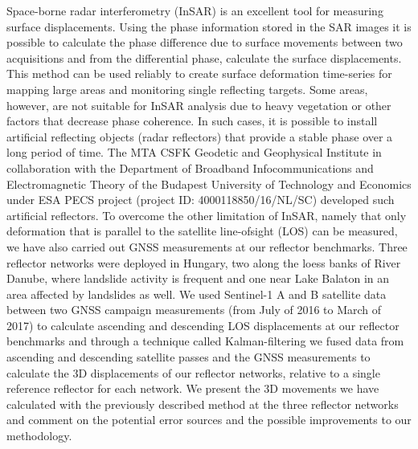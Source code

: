 \documentclass[a0, 18pt, landscape]{a0poster}
\begin{document}
\small

\begin{mdframed}[linecolor=acol, linewidth=4pt,
    innerleftmargin=20pt, innerrightmargin=20pt,
    innerbottommargin=25pt, innertopmargin=30pt,
    backgroundcolor=abcol, roundcorner=2.5pt
    frametitleaboveskip=15pt, frametitlebelowskip=10pt,
    roundcorner=20pt, frametitle={\LARGE Abstract},
    frametitlealignment=\center]

\columnsep=30pt


\begin{multicols}{2}

Space-borne radar interferometry (InSAR) is an excellent tool for measuring surface displacements. Using the phase information stored in the SAR images it is possible to calculate the phase difference due to surface movements between two acquisitions and from the differential phase, calculate the surface displacements.
This method can be used reliably to create surface deformation time-series for mapping large areas and monitoring single reflecting targets. Some areas, however, are not suitable for InSAR analysis due to heavy vegetation or other factors that decrease phase coherence. In such cases, it is possible to install artificial reflecting objects (radar reflectors) that provide a stable phase over a long period of time.
The MTA CSFK Geodetic and Geophysical Institute in collaboration with the Department of Broadband Infocommunications and Electromagnetic Theory of the Budapest University of Technology and Economics under ESA PECS project (project ID: 4000118850/16/NL/SC) developed such artificial reflectors.
To overcome the other limitation of InSAR, namely that only deformation that is parallel to the satellite line-ofsight (LOS) can be measured, we have also carried out GNSS measurements at our reflector benchmarks.
Three reflector networks were deployed in Hungary, two along the loess banks of River Danube, where landslide activity is frequent and one near Lake Balaton in an area affected by landslides as well.
We used Sentinel-1 A and B satellite data between two GNSS campaign measurements (from July of 2016 to March of 2017) to calculate ascending and descending LOS displacements at our reflector benchmarks and through a technique called Kalman-filtering we fused data from ascending and descending satellite passes and the GNSS measurements to calculate the 3D displacements of our reflector networks, relative to a single reference reflector for each network.
We present the 3D movements we have calculated with the previously described method at the three reflector networks and comment on the potential error sources and the possible improvements to our methodology.
\end{multicols}

\end{mdframed}
\end{document}

